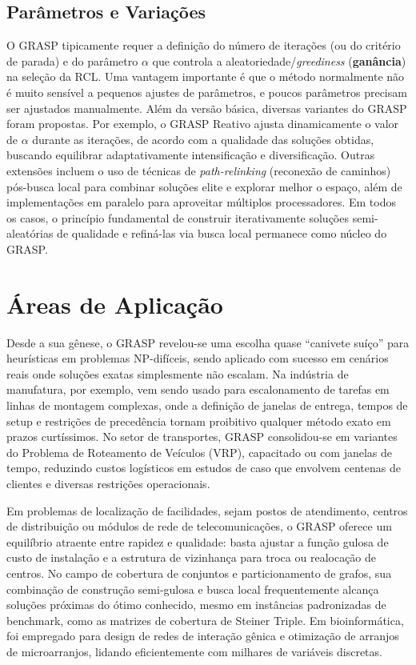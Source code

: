 \documentclass[a4paper, 12pt]{article}
\begin{document}
\subsection{Parâmetros e Variações}
O GRASP tipicamente requer a definição do número de iterações (ou do critério de parada) e do parâmetro $\alpha$ que controla a aleatoriedade/\textit{greediness} (\textbf{ganância}) na seleção da RCL. Uma vantagem importante é que o método normalmente não é muito sensível a pequenos ajustes de parâmetros, e poucos parâmetros precisam ser ajustados manualmente. Além da versão básica, diversas variantes do GRASP foram propostas. Por exemplo, o GRASP Reativo ajusta dinamicamente o valor de $\alpha$ durante as iterações, de acordo com a qualidade das soluções obtidas, buscando equilibrar adaptativamente intensificação e diversificação. Outras extensões incluem o uso de técnicas de \textit{path-relinking} (reconexão de caminhos) pós-busca local para combinar soluções elite e explorar melhor o espaço, além de implementações em paralelo para aproveitar múltiplos processadores. Em todos os casos, o princípio fundamental de construir iterativamente soluções semi-aleatórias de qualidade e refiná-las via busca local permanece como núcleo do GRASP.

\section{Áreas de Aplicação}

Desde a sua gênese, o GRASP revelou-se uma escolha quase “canivete suíço” para heurísticas em problemas NP-difíceis, sendo aplicado com sucesso em cenários reais onde soluções exatas simplesmente não escalam. Na indústria de manufatura, por exemplo, vem sendo usado para escalonamento de tarefas em linhas de montagem complexas, onde a definição de janelas de entrega, tempos de setup e restrições de precedência tornam proibitivo qualquer método exato em prazos curtíssimos. No setor de transportes, GRASP consolidou-se em variantes do Problema de Roteamento de Veículos (VRP), capacitado ou com janelas de tempo, reduzindo custos logísticos em estudos de caso que envolvem centenas de clientes e diversas restrições operacionais.

Em problemas de localização de facilidades, sejam postos de atendimento, centros de distribuição ou módulos de rede de telecomunicações, o GRASP oferece um equilíbrio atraente entre rapidez e qualidade: basta ajustar a função gulosa de custo de instalação e a estrutura de vizinhança para troca ou realocação de centros. No campo de cobertura de conjuntos e particionamento de grafos, sua combinação de construção semi-gulosa e busca local frequentemente alcança soluções próximas do ótimo conhecido, mesmo em instâncias padronizadas de benchmark, como as matrizes de cobertura de Steiner Triple. Em bioinformática, foi empregado para design de redes de interação gênica e otimização de arranjos de microarranjos, lidando eficientemente com milhares de variáveis discretas.
\end{document}
